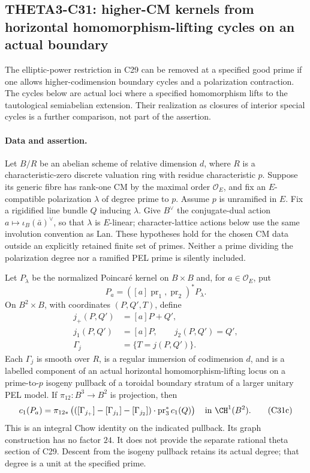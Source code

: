\documentclass[11pt]{article}
\theoremstyle{definition}\newtheorem{definition}[theorem]{Definition}\newtheorem{remark}[theorem]{Remark}
\begin{document}
\subsection{THETA3-C31: higher-CM kernels from horizontal homomorphism-lifting cycles on an actual boundary}\label{C31}

The elliptic-power restriction in C29 can be removed at a specified
good prime if one allows higher-codimension boundary cycles and a
polarization contraction. The cycles below are actual loci where
a specified homomorphism lifts to the tautological semiabelian
extension. Their realization as closures of interior special cycles
is a further comparison, not part of the assertion.

\paragraph{Data and assertion.}
Let $B/R$ be an abelian scheme of relative dimension $d$, where
$R$ is a characteristic-zero discrete valuation ring with residue
characteristic $p$. Suppose its generic fibre has rank-one CM by
the maximal order $\mathcal O_E$, and fix an $E$-compatible
polarization $\lambda$ of degree prime to $p$. Assume $p$ is
unramified in $E$. Fix a rigidified line bundle $Q$ inducing
$\lambda$. Give $B^\vee$ the conjugate-dual action
$a\mapsto\iota_B(\bar a)^\vee$, so that $\lambda$ is
$E$-linear; character-lattice actions below use the same
involution convention as Lan. These hypotheses hold for the chosen CM data outside
an explicitly retained finite set of primes. Neither a prime
dividing the polarization degree nor a ramified PEL prime is
silently included.

Let $P_\lambda$ be the normalized Poincar\'e kernel on $B\times B$
and, for $a\in\mathcal O_E$, put
\[
 P_a=([a]\operatorname{pr}_1,\operatorname{pr}_2)^*P_\lambda.
 \tag{C31a}
\]
On $B^2\times B$, with coordinates $(P,Q',T)$, define
\[
 \begin{aligned}
 j_+(P,Q')&=[a]P+Q',\\
 j_1(P,Q')&=[a]P,\qquad j_2(P,Q')=Q',\\
 \Gamma_j&=\{T=j(P,Q')\}.
 \end{aligned}
 \tag{C31b}
\]
Each $\Gamma_j$ is smooth over $R$, is a regular immersion of
codimension $d$, and is a labelled component of an actual
horizontal homomorphism-lifting locus on a prime-to-$p$ isogeny
pullback of a toroidal boundary stratum of a larger unitary PEL
model. If $\pi_{12}:B^3\to B^2$ is projection, then
\[
 c_1(P_a)=\pi_{12*}\left(
   ([\Gamma_{j_+}]-[\Gamma_{j_1}]-[\Gamma_{j_2}])
                  \cdot\operatorname{pr}_3^*c_1(Q)\right)
                  \quad\hbox{in }\CH^1(B^2).
 \tag{C31c}
\]
This is an integral Chow identity on the indicated pullback.
Its graph construction has no factor $24$. It does not provide
the separate rational theta section of C29. Descent from the
isogeny pullback retains its actual degree; that degree is a
unit at the specified prime.
\end{document}
